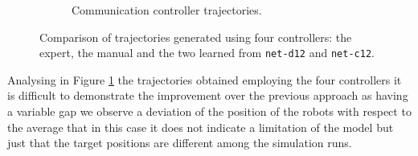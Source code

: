 \begin{figure}[!htb]
\begin{center}
\begin{subfigure}[h]{0.49\textwidth}
			\caption{Communication controller trajectories.}
		\end{subfigure}
	\end{center}
	\vspace{-0.5cm}
	\caption[Evaluation of the trajectories learned by \texttt{net-c12}.]{Comparison 
	of trajectories generated using four controllers: the expert, the manual and 
	the two learned from \texttt{net-d12} and \texttt{net-c12}.}
	\label{fig:net-c12traj}
\end{figure}
Analysing in Figure \ref{fig:net-c12traj} the trajectories obtained employing the 
four controllers it is difficult to demonstrate the improvement over the previous 
approach as having a variable gap we observe a deviation of the position of the 
robots with respect to the average that in this case it does not indicate a limitation 
of the model but just that the target positions are different among the simulation 
runs. 

